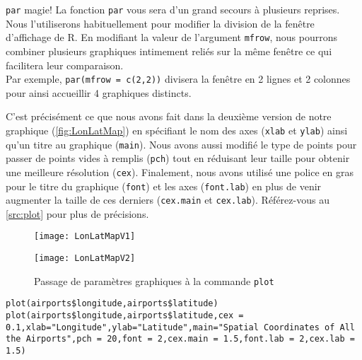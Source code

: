 \begin{moreInfo}{\texttt{par} magie!}
	La fonction \texttt{par} vous sera d'un grand secours à plusieurs reprises. Nous l'utiliserons habituellement pour modifier la division de la fenêtre d'affichage de R. En modifiant la valeur de l'argument \texttt{mfrow}, nous pourrons combiner plusieurs graphiques intimement reliés sur la même fenêtre ce qui facilitera leur comparaison. \\
	Par exemple, \texttt{par(mfrow = c(2,2))} divisera la fenêtre en 2 lignes et 2 colonnes pour ainsi accueillir 4 graphiques distincts.
\end{moreInfo}

C'est précisément ce que nous avons fait dans la deuxième version de notre graphique (\autoref{fig:LonLatMap}) en spécifiant le nom des axes (\texttt{xlab} et \texttt{ylab}) ainsi qu'un titre au graphique (\texttt{main}). Nous avons aussi modifié le type de points pour passer de points vides à remplis (\texttt{pch}) tout en réduisant leur taille pour obtenir une meilleure résolution (\texttt{cex}). Finalement, nous avons utilisé une police en gras pour le titre du graphique (\texttt{font}) et les axes (\texttt{font.lab}) en plus de venir augmenter la taille de ces derniers (\texttt{cex.main} et \texttt{cex.lab}). Référez-vous au \autoref{src:plot} pour plus de précisions. \\
	
\begin{figure}
	\begin{minipage}{\textwidth}
		\centering
		\texttt{[image: LonLatMapV1]}
	\end{minipage}
	\newline
	\begin{minipage}{\textwidth}
		\centering
		\texttt{[image: LonLatMapV2]}
	\end{minipage}
	\caption{Passage de paramètres graphiques à la commande \texttt{plot}}
\end{figure}
\label{fig:LonLatMap}

\begin{lstlisting}[caption = Utilisation de la commande \texttt{plot},label=src:plot]
plot(airports$longitude,airports$latitude)
plot(airports$longitude,airports$latitude,cex = 0.1,xlab="Longitude",ylab="Latitude",main="Spatial Coordinates of All the Airports",pch = 20,font = 2,cex.main = 1.5,font.lab = 2,cex.lab = 1.5)
\end{lstlisting}

